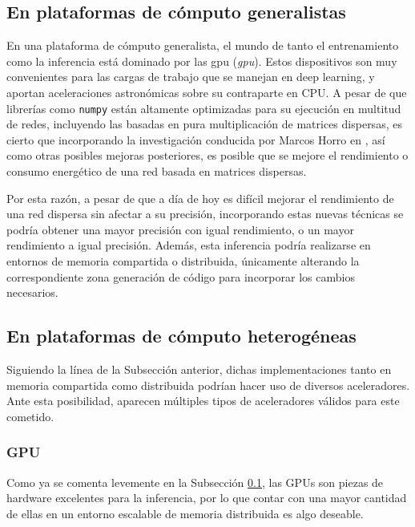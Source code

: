 \subsection{En plataformas de cómputo generalistas}
\label{ssec:posibilidades_en_computo_generalistas}
En una plataforma de cómputo generalista, el mundo de tanto el entrenamiento como la inferencia está dominado por las \acrshort{gpu} (\textit{\acrlong{gpu}}). Estos dispositivos son muy convenientes para las cargas de trabajo que se manejan en deep learning, y aportan aceleraciones astronómicas sobre su contraparte en CPU. A pesar de que librerías como \texttt{numpy} están altamente optimizadas para su ejecución en multitud de redes, incluyendo las basadas en pura multiplicación de matrices dispersas, es cierto que incorporando la investigación conducida por Marcos Horro en \cite{marta_marcos_horro_9804589}, así como otras posibles mejoras posteriores, es posible que se mejore el rendimiento o consumo energético de una red basada en matrices dispersas.

Por esta razón, a pesar de que a día de hoy es difícil mejorar el rendimiento de una red dispersa sin afectar a su precisión, incorporando estas nuevas técnicas se podría obtener una mayor precisión con igual rendimiento, o un mayor rendimiento a igual precisión. Además, esta inferencia podría realizarse en entornos de memoria compartida o distribuida, únicamente alterando la correspondiente zona generación de código para incorporar los cambios necesarios.

\subsection{En plataformas de cómputo heterogéneas}
\label{ssec:posibilidades_en_computo_heterogeneas}
Siguiendo la línea de la Subsección anterior, dichas implementaciones tanto en memoria compartida como distribuida podrían hacer uso de diversos aceleradores. Ante esta posibilidad, aparecen múltiples tipos de aceleradores válidos para este cometido.

\subsubsection{GPU}
\label{sssec:heterogeneas_gpu}
Como ya se comenta levemente en la Subsección \ref{ssec:posibilidades_en_computo_generalistas}, las GPUs son piezas de hardware excelentes para la inferencia, por lo que contar con una mayor cantidad de ellas en un entorno escalable de memoria distribuida es algo deseable.

